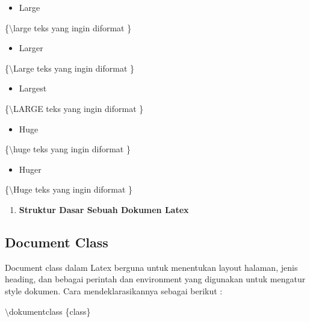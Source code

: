 \begin{itemize}
\item Large
\end{itemize}
\hspace{0,5in}\{$\setminus$large teks yang ingin diformat \}

\begin{itemize}
\item Larger
\end{itemize}
\hspace{0,5in}\{$\setminus$Large teks yang ingin diformat \}

\begin{itemize}
\item Largest
\end{itemize}
\hspace{0,5in}\{$\setminus$LARGE teks yang ingin diformat \}

\begin{itemize}
\item Huge
\end{itemize}
\hspace{0,5in}\{$\setminus$huge teks yang ingin diformat \}

\begin{itemize}
\item Huger
\end{itemize}
\hspace{0,5in}\{$\setminus$Huge teks yang ingin diformat \}

\begin{enumerate}
\setcounter{enumi}{\thenumberedCntB}
\item \textbf{Struktur Dasar Sebuah Dokumen Latex}
\setcounter{numberedCntB}{\theenumi}
\end{enumerate}
\subsection {Document Class}\par \vspace{12pt}

Document class dalam Latex berguna untuk menentukan layout halaman, jenis heading, dan bebagai perintah dan environment yang digunakan untuk mengatur style dokumen. Cara mendeklarasikannya sebagai berikut :\par \vspace{12pt}

$\setminus$dokumentclass \{class\}\par \vspace{12pt}

